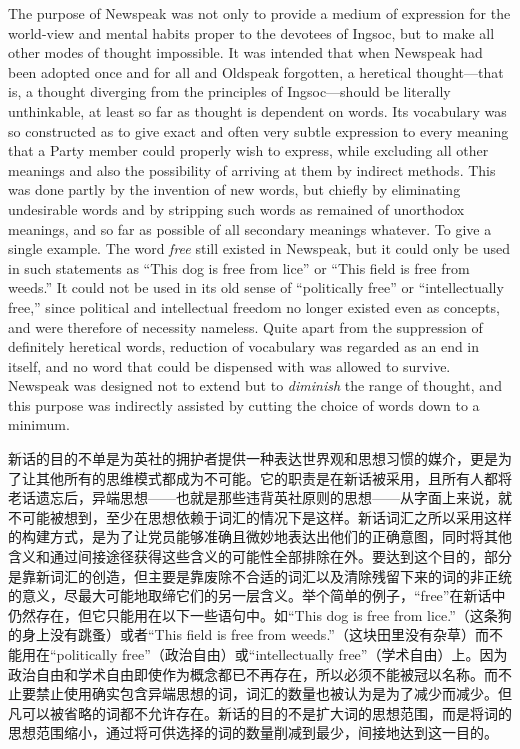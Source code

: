 \begin{paracol}{2}
\switchcolumn*

The purpose of Newspeak was not only to provide a medium of expression
for the world-view and mental habits proper to the devotees of Ingsoc,
but to make all other modes of thought impossible. It was intended that
when Newspeak had been adopted once and for all and Oldspeak forgotten,
a heretical thought---that is, a thought diverging from the principles
of Ingsoc---should be literally unthinkable, at least so far as thought
is dependent on words. Its vocabulary was so constructed as to give
exact and often very subtle expression to every meaning that a Party
member could properly wish to express, while excluding all other
meanings and also the possibility of arriving at them by indirect
methods. This was done partly by the invention of new words, but chiefly
by eliminating undesirable words and by stripping such words as remained
of unorthodox meanings, and so far as possible of all secondary meanings
whatever. To give a single example. The word \emph{free} still existed
in Newspeak, but it could only be used in such statements as ``This dog
is free from lice'' or ``This field is free from weeds.'' It could not be
used in its old sense of ``politically free'' or ``intellectually free,''
since political and intellectual freedom no longer existed even as
concepts, and were therefore of necessity nameless. Quite apart from the
suppression of definitely heretical words, reduction of vocabulary was
regarded as an end in itself, and no word that could be dispensed with
was allowed to survive. Newspeak was designed not to extend but to
\emph{diminish} the range of thought, and this purpose was indirectly
assisted by cutting the choice of words down to a minimum.

\switchcolumn

新话的目的不单是为英社的拥护者提供一种表达世界观和思想习惯的媒介，更是为了让其他所有的思维模式都成为不可能。它的职责是在新话被采用，且所有人都将老话遗忘后，异端思想——也就是那些违背英社原则的思想——从字面上来说，就不可能被想到，至少在思想依赖于词汇的情况下是这样。新话词汇之所以采用这样的构建方式，是为了让党员能够准确且微妙地表达出他们的正确意图，同时将其他含义和通过间接途径获得这些含义的可能性全部排除在外。要达到这个目的，部分是靠新词汇的创造，但主要是靠废除不合适的词汇以及清除残留下来的词的非正统的意义，尽最大可能地取缔它们的另一层含义。举个简单的例子，``free''在新话中仍然存在，但它只能用在以下一些语句中。如``This
dog is free from lice.''（这条狗的身上没有跳蚤）或者``This field is free
from weeds.''（这块田里没有杂草）而不能用在``politically
free''（政治自由）或``intellectually
free''（学术自由）上。因为政治自由和学术自由即使作为概念都已不再存在，所以必须不能被冠以名称。而不止要禁止使用确实包含异端思想的词，词汇的数量也被认为是为了减少而减少。但凡可以被省略的词都不允许存在。新话的目的不是扩大词的思想范围，而是将词的思想范围缩小，通过将可供选择的词的数量削减到最少，间接地达到这一目的。


\end{paracol}
